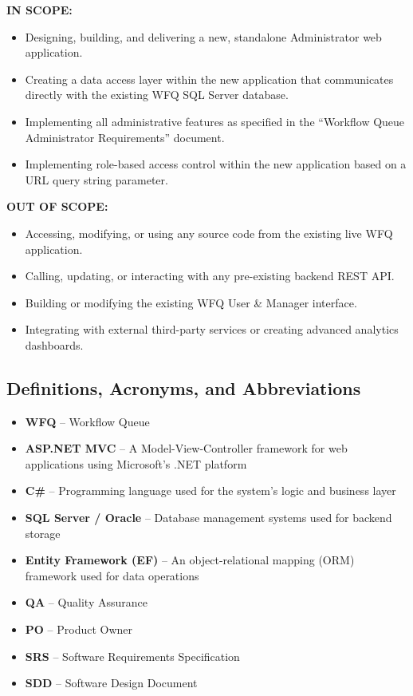 \documentclass[12pt]{article}
\begin{document}
\textbf{IN SCOPE:}
\begin{itemize}
    \item Designing, building, and delivering a new, standalone Administrator web application.
    \item Creating a data access layer within the new application that communicates directly
    with the existing WFQ SQL Server database.
    \item Implementing all administrative features as specified in the ``Workflow Queue
    Administrator Requirements'' document.
    \item Implementing role-based access control within the new application based on a URL
    query string parameter.
\end{itemize}

\textbf{OUT OF SCOPE:}
\begin{itemize}
    \item Accessing, modifying, or using any source code from the existing live WFQ
    application.
    \item Calling, updating, or interacting with any pre-existing backend REST API.
    \item Building or modifying the existing WFQ User \& Manager interface.
    \item Integrating with external third-party services or creating advanced analytics
    dashboards.
\end{itemize}

\subsection{Definitions, Acronyms, and Abbreviations}
\begin{itemize}
    \item \textbf{WFQ} -- Workflow Queue
    \item \textbf{ASP.NET MVC} -- A Model-View-Controller framework for web applications
    using Microsoft's .NET platform
    \item \textbf{C\#} -- Programming language used for the system's logic and business layer
    \item \textbf{SQL Server / Oracle} -- Database management systems used for backend storage
    \item \textbf{Entity Framework (EF)} -- An object-relational mapping (ORM) framework used
    for data operations
    \item \textbf{QA} -- Quality Assurance
    \item \textbf{PO} -- Product Owner
    \item \textbf{SRS} -- Software Requirements Specification
    \item \textbf{SDD} -- Software Design Document
\end{itemize}
\end{document}

